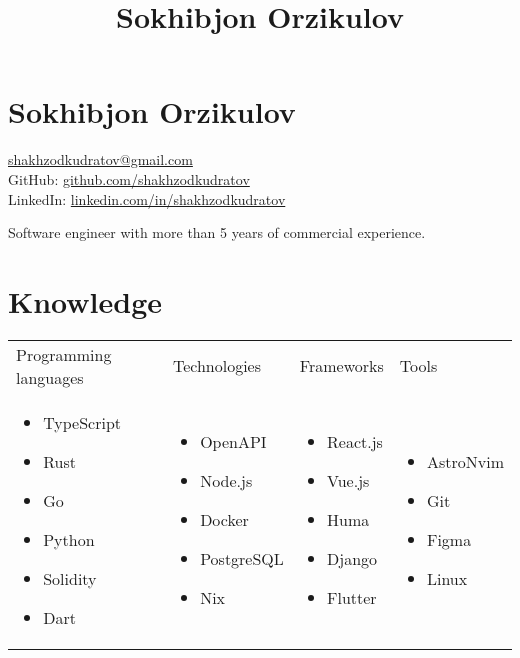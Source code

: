 \documentclass[a4paper,12pt]{article}
\title{Sokhibjon Orzikulov}
\begin{document}
\section*{Sokhibjon Orzikulov}

\href{mailto:shakhzodkudratov@gmail.com}{shakhzodkudratov@gmail.com} \\
GitHub: \href{https://github.com/shakhzodkudratov/}{github.com/shakhzodkudratov} \\
LinkedIn: \href{https://linkedin.com/in/shakhzodkudratov/}{linkedin.com/in/shakhzodkudratov}

\bigskip
Software engineer with more than 5 years of commercial experience.

\section*{Knowledge}

\begin{tabularx}{\textwidth}{X X X X}

  Programming languages & Technologies & Frameworks & Tools \\
  \vspace{-5mm}\begin{itemize}[leftmargin=*] \setlength{\itemsep}{1pt} \setlength{\parskip}{1pt}
    \item TypeScript
    \item Rust
    \item Go
    \item Python
    \item Solidity
    \item Dart
  \end{itemize}&
  \vspace{-5mm}\begin{itemize}[leftmargin=*] \setlength{\itemsep}{1pt} \setlength{\parskip}{1pt}
    \item OpenAPI
    \item Node.js
    \item Docker
    \item PostgreSQL
    \item Nix
  \end{itemize}&
  \vspace{-5mm}\begin{itemize}[leftmargin=*] \setlength{\itemsep}{1pt} \setlength{\parskip}{1pt}
    \item React.js
    \item Vue.js
    \item Huma
    \item Django
    \item Flutter
  \end{itemize} &
  \vspace{-5mm}\begin{itemize}[leftmargin=*] \setlength{\itemsep}{1pt} \setlength{\parskip}{1pt}
    \item AstroNvim
    \item Git
    \item Figma
    \item Linux
  \end{itemize}

\end{tabularx}
\end{document}
